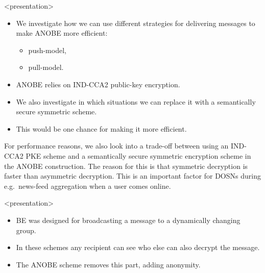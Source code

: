 \begin{frame}<presentation>
  \begin{itemize}

    \item We investigate how we can use different strategies for delivering 
      messages to make \ac{ANOBE} more efficient:
      \begin{itemize}
        \item push-model,
        \item pull-model.
      \end{itemize}

    \item \ac{ANOBE} relies on IND-CCA2 public-key encryption.

    \item We also investigate in which situations we can replace it with 
      a semantically secure symmetric scheme.

    \item This would be one chance for making it more efficient.

  \end{itemize}
\end{frame}

For performance reasons, we also look into a trade-off between using an 
IND-CCA2 \ac{PKE} scheme and a semantically secure symmetric encryption scheme 
in the \ac{ANOBE} construction.
The reason for this is that symmetric decryption is faster than asymmetric 
decryption.
This is an important factor for \acp{DOSN} during e.g.~news-feed aggregation 
when a user comes online.

\begin{frame}<presentation>
  \begin{itemize}
    \item \ac{BE} was designed for broadcasting a message to a dynamically 
      changing group.

    \item In these schemes any recipient can see who else can also decrypt the 
      message.

    \item The \ac{ANOBE} scheme removes this part, adding anonymity.

  \end{itemize}
\end{frame}

